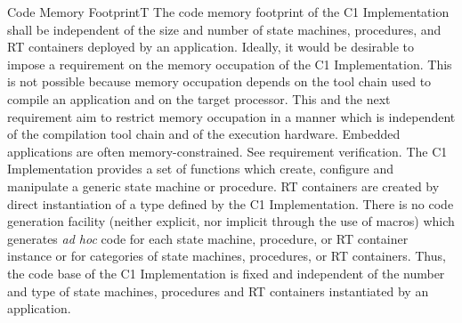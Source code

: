 \documentclass[requirements]{../fwprofile}
\begin{document}
\begin{fw_req_note}{Code Memory Footprint}{T}
{The code memory footprint of the C1 Implementation shall be independent of 
the size and number of state machines, procedures, and RT containers deployed by an application.}
{Ideally, it would be desirable to impose a requirement on the memory occupation 
of the C1 Implementation. 
This is not possible because memory occupation depends on the tool chain used to compile an 
application and on the target processor. 
This and the next requirement aim to restrict memory occupation in a manner which is independent of the compilation tool chain and of the execution hardware.}
{Embedded applications are often memory-constrained.}
{See requirement verification.} 
{The C1 Implementation provides a set of functions which create, 
configure and manipulate a generic state machine or procedure. 
RT containers are created by direct instantiation of a type defined by the C1 Implementation. 
There is no code generation facility (neither explicit, nor implicit through the use of macros) which generates \emph{ad hoc} code for each state machine, procedure, or RT container instance or for categories of state machines, procedures, or RT containers. 
Thus, the code base of the C1 Implementation is fixed and independent of the number 
and type of state machines, procedures and RT containers instantiated by an application.}
\end{fw_req_note}
\end{document}

